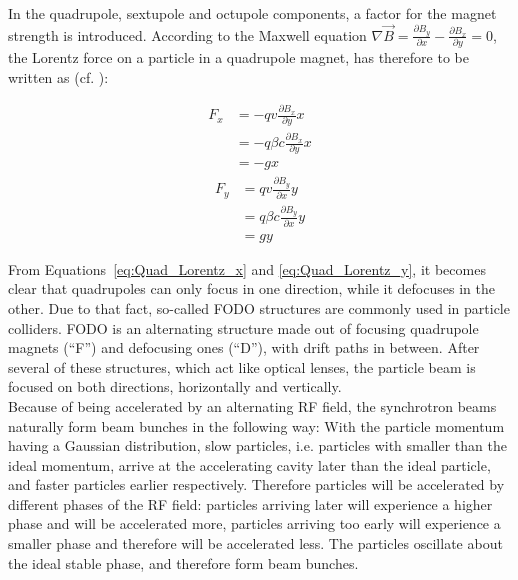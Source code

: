 In the quadrupole, sextupole and octupole components, a factor for the magnet strength is introduced.
According to the Maxwell equation $\nabla \vec{B} = \frac{\partial B_y}{\partial x} -\frac{\partial B_x}{\partial y} = 0$, the Lorentz force on a particle in a quadrupole magnet, has therefore to be written as (cf. \cite[p. 372]{VacuumElectronics}):
\begin{multicols}{2}
\noindent 
\begin{align}
 F_x &= -qv\frac{\partial B_x}{\partial y}x \nonumber\\
  &= -q\beta c\frac{\partial B_x}{\partial y}x\\
  &= -gx\label{eq:Quad_Lorentz_x}
\end{align}
\columnbreak
\begin{align}
 F_y &= qv\frac{\partial B_y}{\partial x}y\nonumber \\
  &= q\beta c\frac{\partial B_y}{\partial x}y\\
  &= gy \label{eq:Quad_Lorentz_y}
\end{align}
\end{multicols}
From Equations~\ref{eq:Quad_Lorentz_x} and \ref{eq:Quad_Lorentz_y}, it becomes clear that quadrupoles can only focus in one direction, while it defocuses in the other.
Due to that fact, so-called FODO structures are commonly used in particle colliders.
FODO is an alternating structure made out of focusing quadrupole magnets (``F'') and defocusing ones (``D''), with drift paths in between.
After several of these structures, which act like optical lenses, the particle beam is focused on both directions, horizontally and vertically.\\
Because of being accelerated by an alternating RF field, the synchrotron beams naturally form beam bunches in the following way:
With the particle momentum having a Gaussian distribution, slow particles, i.e. particles with smaller than the ideal momentum, arrive at the accelerating cavity later than the ideal particle, and faster particles earlier respectively.
Therefore particles will be accelerated by different phases of the RF field: particles arriving later will experience a higher phase and will be accelerated more, particles arriving too early will experience a smaller phase and therefore will be accelerated less.
The particles oscillate about the ideal stable phase, and therefore form beam bunches.

